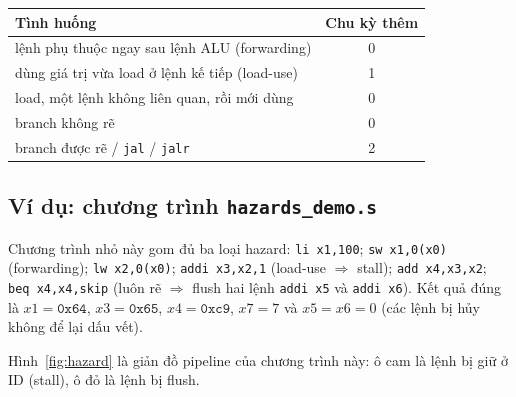 \documentclass[11pt,a4paper]{article}
\begin{document}
\begin{center}
\small
\begin{tabular}{@{}lc@{}}
\toprule
\textbf{Tình huống} & \textbf{Chu kỳ thêm}\\
\midrule
lệnh phụ thuộc ngay sau lệnh ALU (forwarding) & 0\\
dùng giá trị vừa load ở lệnh kế tiếp (load-use) & 1\\
load, một lệnh không liên quan, rồi mới dùng & 0\\
branch không rẽ & 0\\
branch được rẽ / \texttt{jal} / \texttt{jalr} & 2\\
\bottomrule
\end{tabular}
\end{center}

\subsection{Ví dụ: chương trình \texttt{hazards\_demo.s}}
Chương trình nhỏ này gom đủ ba loại hazard: \texttt{li x1,100}; \texttt{sw x1,0(x0)} (forwarding); \texttt{lw x2,0(x0)}; \texttt{addi x3,x2,1} (load-use $\Rightarrow$ stall);
\texttt{add x4,x3,x2}; \texttt{beq x4,x4,skip} (luôn rẽ $\Rightarrow$ flush hai lệnh \texttt{addi x5} và \texttt{addi x6}). Kết quả đúng là $x1=\mathtt{0x64}$, $x3=\mathtt{0x65}$, $x4=\mathtt{0xc9}$, $x7=7$
và $x5=x6=0$ (các lệnh bị hủy không để lại dấu vết).

Hình~\ref{fig:hazard} là giản đồ pipeline của chương trình này: ô cam là lệnh bị giữ ở ID (stall), ô đỏ là lệnh bị flush.
\end{document}
